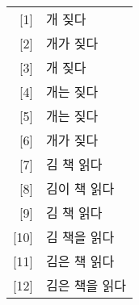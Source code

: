 \documentclass[a4paper]{article}
\begin{document}
\begin{tabular}[t]{rl}
{[1]} & 개 짖다 \\
{[2]} & 개가 짖다 \\
{[3]} & 개 짖다 \\
{[4]} & 개는 짖다 \\
{[5]} & 개는 짖다 \\
{[6]} & 개가 짖다 \\
{[7]} & 김 책 읽다 \\
{[8]} & 김이 책 읽다 \\
{[9]} & 김 책 읽다 \\ 
{[10]} & 김 책을 읽다 \\
{[11]} & 김은 책 읽다 \\
{[12]} & 김은 책을 읽다 \\
\end{tabular}
\end{document}
